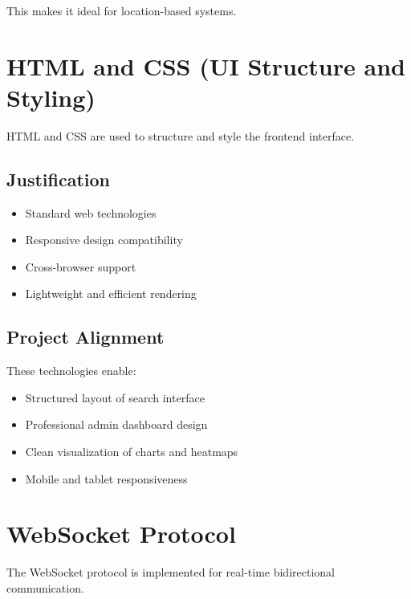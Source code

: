 \documentclass[12pt,a4paper]{report}
\begin{document}
This makes it ideal for location-based systems.

\section{HTML and CSS (UI Structure and Styling)}

HTML and CSS are used to structure and style the frontend interface.

\subsection*{Justification}

\begin{itemize}

\item Standard web technologies

\item Responsive design compatibility

\item Cross-browser support

\item Lightweight and efficient rendering

\end{itemize}

\subsection*{Project Alignment}

These technologies enable:

\begin{itemize}

\item Structured layout of search interface

\item Professional admin dashboard design

\item Clean visualization of charts and heatmaps

\item Mobile and tablet responsiveness

\end{itemize}

\section{WebSocket Protocol}

The WebSocket protocol is implemented for real-time bidirectional communication.
\end{document}
